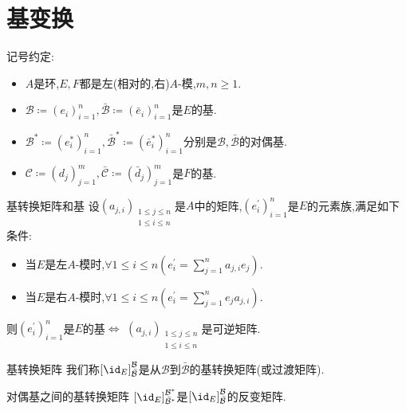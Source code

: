 \section{基变换}

记号约定:

\begin{itemize}
	\item $A$是环,$E,F$都是左(相对的,右)$A$-模,$m,n\geq 1$.
	\item $\mathcal{B}\coloneq\left(e_{i}\right)_{i=1}^{n},\bar{\mathcal{B}}\coloneq\left(\bar{e}_{i}\right)_{i=1}^{n}$是$E$的基.
	\item $\mathcal{B}^{\ast}\coloneq\left(e_{i}^{\ast}\right)_{i=1}^{n},\bar{\mathcal{B}}^{\ast}\coloneq\left(\bar{e}_{i}^{\ast}\right)_{i=1}^{n}$分别是$\mathcal{B},\bar{\mathcal{B}}$的对偶基.
	\item $\mathcal{C}\coloneq\left(d_{j}\right)_{j=1}^{m},\bar{\mathcal{C}}\coloneq\left(\bar{d}_{j}\right)_{j=1}^{m}$是$F$的基.
\end{itemize}

\begin{proposition}{基转换矩阵和基}{}
	设$\left(a_{j,i}\right)_{\substack{1\leq j\leq n\\1\leq i\leq n}}$是$A$中的矩阵,$\left(e_{i}^{\prime}\right)_{i=1}^{n}$是$E$的元素族,满足如下条件:
	\begin{itemize}
		\item 当$E$是左$A$-模时,$\forall 1\leq i\leq n\left(e_{i}^{\prime}=\sum\limits_{j=1}^{n}a_{j,i}e_{j}\right)$.
		\item 当$E$是右$A$-模时,$\forall 1\leq i\leq n\left(e_{i}^{\prime}=\sum\limits_{j=1}^{n}e_{j}a_{j,i}\right)$.
	\end{itemize}
	则$\left(e_{i}^{\prime}\right)_{i=1}^{n}$是$E$的基$\iff$ $\left(a_{j,i}\right)_{\substack{1\leq j\leq n\\1\leq i\leq n}}$是可逆矩阵.
\end{proposition}

\begin{definition}{基转换矩阵}{}
	我们称$\left[\id_{E}\right]_{\bar{\mathcal{B}}}^{\mathcal{B}}$是从$\mathcal{B}$到$\bar{\mathcal{B}}$的基转换矩阵(或过渡矩阵).
\end{definition}

\begin{proposition}{对偶基之间的基转换矩阵}{}
	$\left[\id_{E}\right]_{\bar{\mathcal{B}}^{\ast}}^{\mathcal{B}^{\ast}}$是$\left[\id_{E}\right]_{\bar{\mathcal{B}}}^{\mathcal{B}}$的反变矩阵.
\end{proposition}

